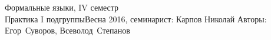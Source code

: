 \newcommand{\UseIndex}{}


\newcommand{\somealpha}[1]{\underbrace{\alpha\dots\alpha}_{#1}}

\newcommand{\problem}[1]{\subsection{Задача #1}\index{#1@Задача #1}\label{prob#1}}
\newcommand{\subproblem}[2]{\subsection{Задача #1#2}\index{#1@Задача #1!#2}\label{prob#1#2}}


\BigHeader
    {Формальные языки, IV семестр\\Практика I подгруппы}{Весна 2016, семинарист: Карпов Николай}
    {Авторы: Егор~Суворов, Всеволод~Степанов}
\gdef\LectureName{Формальные языки, IV семестр}














